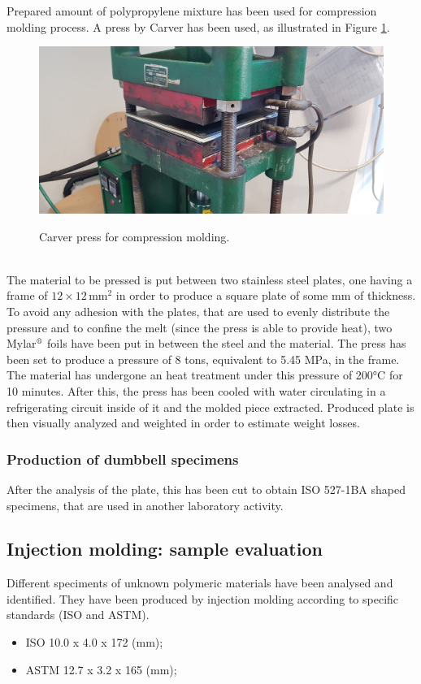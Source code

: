 \documentclass[a4paper, 11pt]{article}
\begin{document}
Prepared amount of polypropylene mixture has been used for compression molding process. A press by Carver has been used, as illustrated in Figure \ref{fig:press}. 
\begin{figure}[htp]
	\centering
	\includegraphics[scale=0.2]
	{PHOTO-2019-05-23-17-38-03.jpg}
	\label{fig:press}
	\caption{Carver press for compression molding.}
\end{figure}\\
The material to be pressed is put between two stainless steel plates, one having a frame of $12\times 12\, \text{mm}^2$ in order to produce a square plate of some mm of thickness. To avoid any adhesion with the plates, that are used to evenly distribute the pressure and to confine the melt (since the press is able to provide heat), two Mylar${^\text{\textregistered}}$ foils have been put in between the steel and the material. The press has been set to produce a pressure of 8 tons, equivalent to 5.45 MPa, in the frame. The material has undergone an heat treatment under this pressure of 200°C for 10 minutes. After this, the press has been cooled with water circulating in a refrigerating circuit inside of it and the molded piece extracted. Produced plate is then visually analyzed and weighted in order to estimate weight losses. \par 

\subsubsection{Production of dumbbell specimens}

After the analysis of the plate, this has been cut to obtain ISO 527-1BA shaped specimens, that are used in another laboratory activity.     

\subsection{Injection molding: sample evaluation}
Different speciments of unknown polymeric materials have been analysed and identified. They have been produced by injection molding according to specific standards (ISO and ASTM).
\begin{itemize}
\item ISO 10.0 x 4.0 x 172 (mm);
\item ASTM 12.7 x 3.2 x 165 (mm);
\end{itemize}
\end{document}
